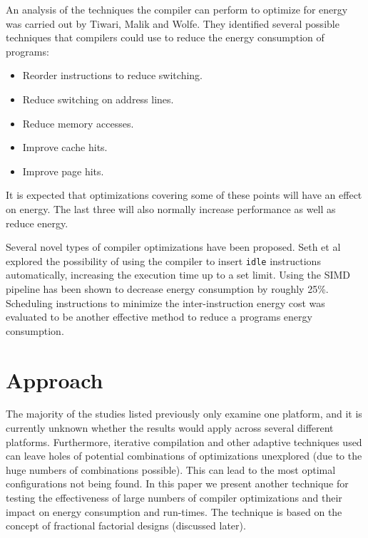 \documentclass[twocolumn]{article}
\begin{document}
An analysis of the techniques the compiler can perform to optimize for energy was carried out by Tiwari, Malik and Wolfe\cite{CompilationTechniquesForLowEnergy}. They identified several possible techniques that compilers could use to reduce the energy consumption of programs:
\begin{itemize}
	\setlength{\itemsep}{-0.4em}
	\vspace{-2mm}

	\item Reorder instructions to reduce switching.
	\item Reduce switching on address lines.
	\item Reduce memory accesses.
	\item Improve cache hits.
	\item Improve page hits.
\end{itemize}

It is expected that optimizations covering some of these points will have an effect on energy. The last three will also normally increase performance as well as reduce energy.

Several novel types of compiler optimizations have been proposed. Seth et al\cite{Seth2001} explored the possibility of using the compiler to insert \texttt{idle} instructions automatically, increasing the execution time up to a set limit. Using the SIMD pipeline has been shown to decrease energy consumption\cite{Ibrahim2009} by roughly 25\%. Scheduling instructions to minimize the inter-instruction energy cost was evaluated to be another effective method to reduce a programs energy consumption\cite{Parikh}.

\section{Approach}

The majority of the studies listed previously only examine one platform, and it is currently unknown whether the results would apply across several different platforms. Furthermore, iterative compilation and other adaptive techniques used can leave holes of potential combinations of optimizations unexplored (due to the huge numbers of combinations possible). This can lead to the most optimal configurations not being found. In this paper we present another technique for testing the effectiveness of large numbers of compiler optimizations and their impact on energy consumption and run-times. The technique is based on the concept of fractional factorial designs (discussed later).
\end{document}
